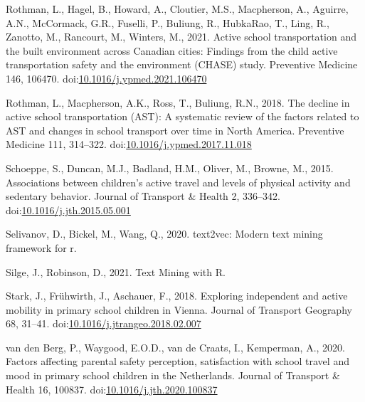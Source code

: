 \documentclass[]{elsarticle} %
\newlength{\cslhangindent}
\newlength{\cslentryspacingunit} %
\newenvironment{CSLReferences}[2] %
 {%
  \setlength{\parindent}{0pt}
  \ifodd #1
  \let\oldpar\par
  \def\par{\hangindent=\cslhangindent\oldpar}
  \fi
  \setlength{\parskip}{#2\cslentryspacingunit}
 }%
 {}
\begin{document}
\begin{CSLReferences}{1}{0}
\leavevmode{}%
Rothman, L., Hagel, B., Howard, A., Cloutier, M.S., Macpherson, A.,
Aguirre, A.N., McCormack, G.R., Fuselli, P., Buliung, R., HubkaRao, T.,
Ling, R., Zanotto, M., Rancourt, M., Winters, M., 2021. Active school
transportation and the built environment across {Canadian} cities:
Findings from the child active transportation safety and the environment
({CHASE}) study. Preventive Medicine 146, 106470.
doi:\href{https://doi.org/10.1016/j.ypmed.2021.106470}{10.1016/j.ypmed.2021.106470}

\leavevmode{}%
Rothman, L., Macpherson, A.K., Ross, T., Buliung, R.N., 2018. The
decline in active school transportation ({AST}): A systematic review of
the factors related to {AST} and changes in school transport over time
in {North America}. Preventive Medicine 111, 314--322.
doi:\href{https://doi.org/10.1016/j.ypmed.2017.11.018}{10.1016/j.ypmed.2017.11.018}

\leavevmode{}%
Schoeppe, S., Duncan, M.J., Badland, H.M., Oliver, M., Browne, M., 2015.
Associations between children's active travel and levels of physical
activity and sedentary behavior. Journal of Transport \& Health 2,
336--342.
doi:\href{https://doi.org/10.1016/j.jth.2015.05.001}{10.1016/j.jth.2015.05.001}

\leavevmode{}%
Selivanov, D., Bickel, M., Wang, Q., 2020. text2vec: Modern text mining
framework for r.

\leavevmode{}%
Silge, J., Robinson, D., 2021. Text {Mining} with {R}.

\leavevmode{}%
Stark, J., Frühwirth, J., Aschauer, F., 2018. Exploring independent and
active mobility in primary school children in {Vienna}. Journal of
Transport Geography 68, 31--41.
doi:\href{https://doi.org/10.1016/j.jtrangeo.2018.02.007}{10.1016/j.jtrangeo.2018.02.007}

\leavevmode{}%
van den Berg, P., Waygood, E.O.D., van de Craats, I., Kemperman, A.,
2020. Factors affecting parental safety perception, satisfaction with
school travel and mood in primary school children in the {Netherlands}.
Journal of Transport \& Health 16, 100837.
doi:\href{https://doi.org/10.1016/j.jth.2020.100837}{10.1016/j.jth.2020.100837}


\end{CSLReferences}
\end{document}
